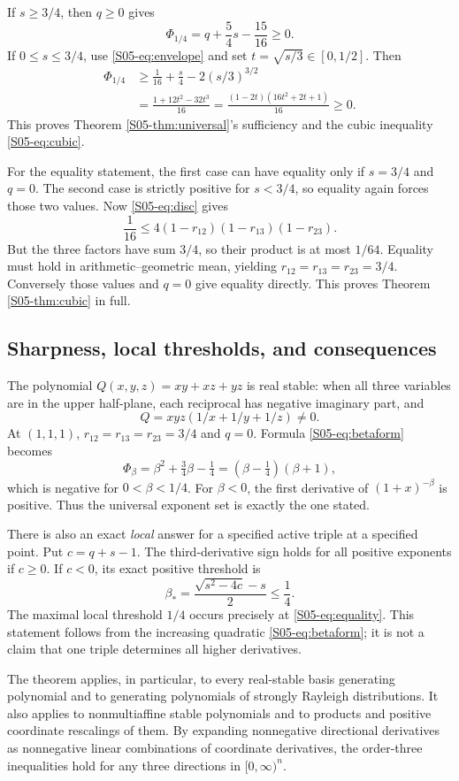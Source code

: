 \documentclass[11pt,a4paper]{article}
\theoremstyle{definition}\newtheorem{definition}[theorem]{Definition}
\theoremstyle{remark}\newtheorem{remark}[theorem]{Remark}
\numberwithin{equation}{section}
\begin{document}
If $s\ge3/4$, then $q\ge0$ gives
\[
 \Phi_{1/4}=q+\frac54s-\frac{15}{16}\ge0.
\]
If $0\le s\le3/4$, use \eqref{S05-eq:envelope} and set $t=\sqrt{s/3}\in[0,1/2]$. Then
\begin{align*}
 \Phi_{1/4}
 &\ge\frac1{16}+\frac{s}{4}-2(s/3)^{3/2}\\
 &=\frac{1+12t^2-32t^3}{16}
 =\frac{(1-2t)(16t^2+2t+1)}{16}\ge0.
\end{align*}
This proves Theorem \ref{S05-thm:universal}'s sufficiency and the cubic inequality \eqref{S05-eq:cubic}.

For the equality statement, the first case can have equality only if $s=3/4$ and $q=0$. The second case is strictly positive for $s<3/4$, so equality again forces those two values. Now \eqref{S05-eq:disc} gives
\[
 \frac1{16}\le4(1-r_{12})(1-r_{13})(1-r_{23}).
\]
But the three factors have sum $3/4$, so their product is at most $1/64$. Equality must hold in arithmetic--geometric mean, yielding $r_{12}=r_{13}=r_{23}=3/4$. Conversely those values and $q=0$ give equality directly. This proves Theorem \ref{S05-thm:cubic} in full.

\subsection{Sharpness, local thresholds, and consequences}\label{S05-sec-5}
The polynomial $Q(x,y,z)=xy+xz+yz$ is real stable: when all three variables are in the upper half-plane, each reciprocal has negative imaginary part, and
\[
 Q=xyz(1/x+1/y+1/z)\ne0.
\]
At $(1,1,1)$, $r_{12}=r_{13}=r_{23}=3/4$ and $q=0$. Formula \eqref{S05-eq:betaform} becomes
\[
 \Phi_\beta=\beta^2+\tfrac34\beta-\tfrac14
 =(\beta-\tfrac14)(\beta+1),
\]
which is negative for $0<\beta<1/4$. For $\beta<0$, the first derivative of $(1+x)^{-\beta}$ is positive. Thus the universal exponent set is exactly the one stated.

There is also an exact \emph{local} answer for a specified active triple at a specified point. Put $c=q+s-1$. The third-derivative sign holds for all positive exponents if $c\ge0$. If $c<0$, its exact positive threshold is
\[
 \beta_* =\frac{\sqrt{s^2-4c}-s}{2}\le\frac14.
\]
The maximal local threshold $1/4$ occurs precisely at \eqref{S05-eq:equality}. This statement follows from the increasing quadratic \eqref{S05-eq:betaform}; it is not a claim that one triple determines all higher derivatives.

The theorem applies, in particular, to every real-stable basis generating polynomial and to generating polynomials of strongly Rayleigh distributions. It also applies to nonmultiaffine stable polynomials and to products and positive coordinate rescalings of them. By expanding nonnegative directional derivatives as nonnegative linear combinations of coordinate derivatives, the order-three inequalities hold for any three directions in $[0,\infty)^n$.
\end{document}
